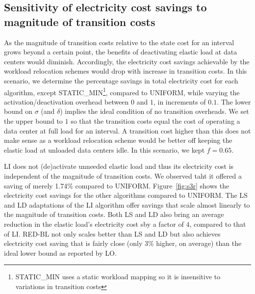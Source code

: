 \subsection{Sensitivity of electricity cost savings to magnitude of transition costs}
As the magnitude of transition costs relative to the state cost for an interval grows beyond a certain point, the benefits of deactivating elastic load at data centers would diminish. Accordingly, the electricity cost savings achievable by the workload relocation schemes would drop with increase in transition costs. In this scenario, we determine the percentage savings in total
    electricity cost for each algorithm, except
    STATIC\_MIN\footnote{STATIC\_MIN uses a static workload mapping so it is insensitive to variations in transition costs}, compared to UNIFORM, while varying the activation/deactivation overhead
    between $0$ and $1$, in increments of
    $0.1$. The lower bound on $\sigma$ (and $\delta$)
    implies the ideal condition of no transition overheads.
    We set the upper bound to $1$ so that the
    transition costs equal the cost of operating a data
    center at full load for an interval. A transition cost
    higher than this does not make sense as a workload relocation scheme would be better off keeping the elastic load at unloaded data centers idle. In this scenario,
    we kept $f=0.65$.

LI does not (de)activate unneeded elastic load and thus its electricity cost is independent of the magnitude of transition costs. We observed taht it offered a saving of merely 1.74\% compared to UNIFORM. Figure~\ref{fig:s3r} shows the electricity cost savings for the other algorithms compared to UNIFORM. The LS and LD adaptations of the LI algorithm offer savings that scale almost linearly to the magnitude of transition costs. Both LS and LD also bring an average reduction in the elastic load's electricity cost sby a factor of $4$, compared to that of LI. RED-BL not only scales better than LS and LD but also achieves electricity cost saving that is fairly close (only $3\%$ higher, on average) than the ideal lower bound as reported by LO.


